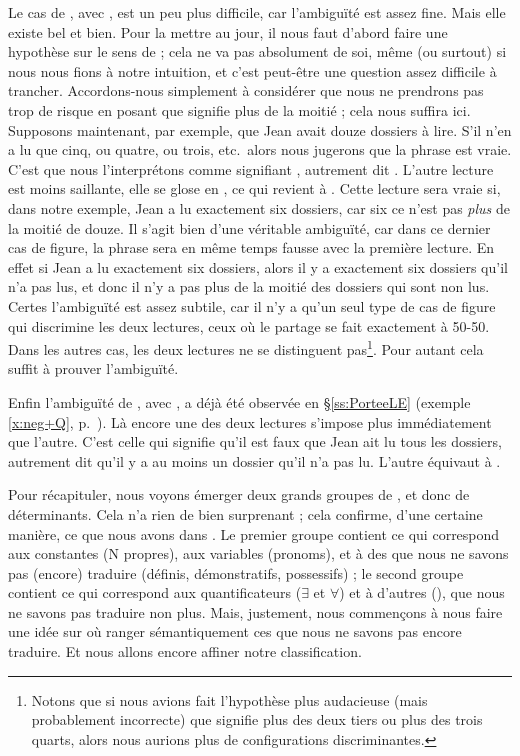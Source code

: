 Le cas de \Last[k], avec , est un peu plus difficile, car l'ambiguïté est assez fine. Mais elle existe bel et bien. Pour la mettre au jour, il nous faut d'abord faire une hypothèse sur le sens de  ; cela ne va pas absolument de soi, même (ou surtout) si nous nous fions à notre intuition, et c'est peut-être une question assez difficile à trancher. Accordons-nous simplement à considérer que nous ne prendrons pas trop de risque en posant que  signifie  plus de la moitié ; cela nous suffira ici.
Supposons maintenant, par exemple, que Jean avait douze dossiers à lire. S'il n'en a lu que cinq, ou quatre, ou trois, etc.\ alors nous jugerons que la phrase \Last[k] est vraie. C'est que nous l'interprétons comme signifiant , autrement dit . L'autre lecture est moins saillante, elle se glose en , ce qui revient à . Cette lecture sera vraie si, dans notre exemple, Jean a lu exactement six dossiers, car six ce n'est pas \emph{plus} de la moitié de douze.  Il s'agit bien d'une véritable ambiguïté, car dans ce dernier cas de figure, la phrase sera en même temps fausse avec la première lecture. En effet si Jean a lu exactement six dossiers, alors il y a exactement six dossiers qu'il n'a pas lus, et donc il n'y a pas plus de la moitié des dossiers qui sont non lus.
Certes l'ambiguïté est assez subtile, car il n'y a qu'un seul type de cas de figure qui discrimine les deux lectures, ceux où le partage se fait exactement à 50-50.
Dans les autres cas, les deux lectures ne se distinguent pas\footnote{Notons que si nous avions fait l'hypothèse plus audacieuse (mais probablement incorrecte) que  signifie plus des deux tiers ou plus des trois quarts, alors nous aurions plus de configurations discriminantes.}. Pour autant cela suffit à prouver l'ambiguïté.

Enfin l'ambiguïté de \Last[l], avec , a déjà été observée en 
\S\ref{ss:PorteeLE}
(exemple \ref{x:neg+Q}, p.~\pageref{x:neg+Q}). Là encore une des deux lectures s'impose plus immédiatement que l'autre.  C'est celle qui signifie qu'il est faux que Jean ait lu tous les dossiers, autrement dit qu'il y a au moins un dossier qu'il n'a pas lu.  L'autre équivaut à .



Pour récapituler, nous voyons émerger deux grands groupes de {\GN}, et donc de déterminants. 
Cela n'a rien de bien surprenant ; cela confirme, d'une certaine manière, ce que nous avons dans {\LO}. Le premier  groupe contient ce qui correspond aux constantes (N propres), aux variables (pronoms), et à des {\GN} que nous ne savons pas (encore) traduire (définis, démonstratifs, possessifs) ; le second groupe contient ce qui correspond aux quantificateurs ($\exists$ et $\forall$) et à d'autres {\GN} (), que nous ne savons pas traduire non plus.  
Mais, justement, nous commençons à nous faire une idée sur où ranger sémantiquement ces {\GN} que nous ne savons pas encore traduire. Et nous allons encore affiner notre classification.


